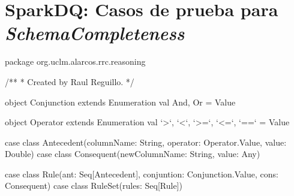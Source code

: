 \chapter{SparkDQ: Casos de prueba para \textit{SchemaCompleteness}}
\label{reasoning-rule}
\begin{listing}[
  language = scala,
  numbers=left,
  numberstyle=\tiny,
  stepnumber=5,
  numbersep=5pt,
  frame=single,
  caption  = {SparkDQ: Formalización de reglas en SparkDQ},
  label    = code:sparkdq.reasoning]
package org.uclm.alarcos.rrc.reasoning

/**
  * Created by Raul Reguillo. 
  */

object Conjunction extends Enumeration {
  val And, Or = Value
}

object Operator extends Enumeration {
  val `>`, `<`, `>=`, `<=`, `==` = Value
}

case class Antecedent(columnName: String, operator: Operator.Value, value: Double)
case class Consequent(newColumnName: String, value: Any)

case class Rule(ant: Seq[Antecedent], conjuntion: Conjunction.Value, cons: Consequent)
case class RuleSet(rules: Seq[Rule])
\end{listing}
